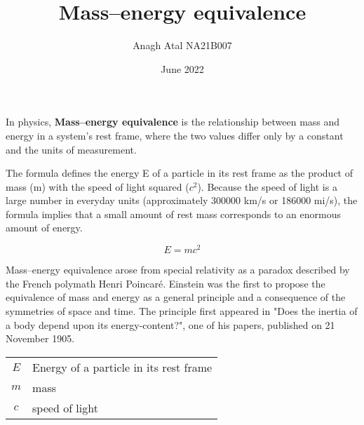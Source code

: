 \documentclass{article}
\title{\textbf{Mass–energy equivalence}}
\date{June 2022}
\author{Anagh Atal NA21B007}
\begin{document}
  \maketitle
\large
\paragraph{} In physics, \textbf{Mass–energy equivalence} is the relationship between mass and energy in a system's rest frame, where the two values differ only by a constant and the units of measurement.

The formula defines the energy E of a particle in its rest frame as the product of mass (m) with the speed of light squared ($c^{2}$). Because the speed of light is a large number in everyday units (approximately 300000 km/s or 186000 mi/s), the formula implies that a small amount of rest mass corresponds to an enormous amount of energy.

\vspace{1cm}


\boldmath
\begin{equation}
  E=mc^2
\end{equation}

\vspace{1cm}

Mass–energy equivalence arose from special relativity as a paradox described by the French polymath Henri Poincaré. Einstein was the first to propose the equivalence of mass and energy as a general principle and a consequence of the symmetries of space and time. The principle first appeared in "Does the inertia of a body depend upon its energy-content?", one of his papers, published on 21 November 1905.
\vspace{1cm}

\begin{tabular}{|c|l|}
    \hline
    $E$ & Energy of a particle in its rest frame\\
    $m$ & mass\\
    $c$ &  speed of light\\
    \hline
\end{tabular}
\end{document}
